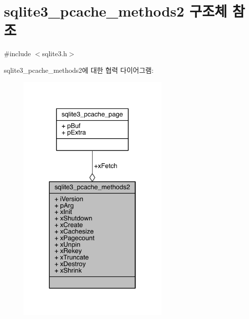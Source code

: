 \hypertarget{structsqlite3__pcache__methods2}{}\section{sqlite3\+\_\+pcache\+\_\+methods2 구조체 참조}
\label{structsqlite3__pcache__methods2}


{\ttfamily \#include $<$sqlite3.\+h$>$}



sqlite3\+\_\+pcache\+\_\+methods2에 대한 협력 다이어그램\+:
\nopagebreak
\begin{figure}[H]
\begin{center}
\leavevmode
\includegraphics[width=212pt]{structsqlite3__pcache__methods2__coll__graph}
\end{center}
\end{figure}

